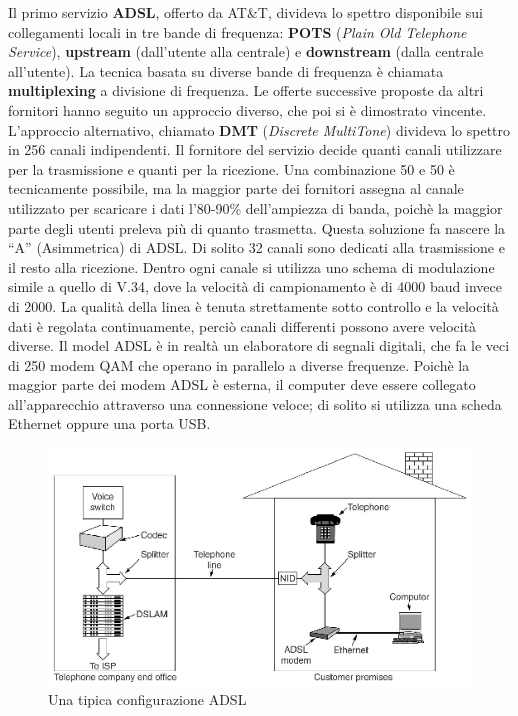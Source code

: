 Il primo servizio \textbf{ADSL}, offerto da AT\&T, divideva lo spettro disponibile sui collegamenti locali in tre bande di frequenza: \textbf{POTS} (\textit{Plain Old Telephone Service}), \textbf{upstream} (dall'utente alla centrale) e \textbf{downstream} (dalla centrale all'utente). La tecnica basata su diverse bande di frequenza è chiamata \textbf{multiplexing} a divisione di frequenza.
Le offerte successive proposte da altri fornitori hanno seguito un approccio diverso, che poi si è dimostrato vincente. L'approccio alternativo, chiamato \textbf{DMT} (\textit{Discrete MultiTone}) divideva lo spettro in 256 canali indipendenti. Il fornitore del servizio decide quanti canali utilizzare per la trasmissione e quanti per la ricezione. Una combinazione 50 e 50 è tecnicamente possibile, ma la maggior parte dei fornitori assegna al canale utilizzato per scaricare i dati l'80-90\% dell'ampiezza di banda, poichè la maggior parte degli utenti preleva più di quanto trasmetta. Questa soluzione fa nascere la ``A'' (Asimmetrica) di ADSL. Di solito 32 canali sono dedicati alla trasmissione e il resto alla ricezione.
Dentro ogni canale si utilizza uno schema di modulazione simile a quello di V.34, dove la velocità di campionamento è di 4000 baud invece di 2000. La qualità della linea è tenuta strettamente sotto controllo e la velocità dati è regolata continuamente, perciò canali differenti possono avere velocità diverse.
Il model ADSL è in realtà un elaboratore di segnali digitali, che fa le veci di 250 modem QAM che operano in parallelo a diverse frequenze. Poichè la maggior parte dei modem ADSL è esterna, il computer deve essere collegato all'apparecchio attraverso una connessione veloce; di solito si utilizza una scheda Ethernet oppure una porta USB.

\begin{figure}[htbp]
\centering
\includegraphics[width=120mm]{images/adsl_configuration.png}
\caption{Una tipica configurazione ADSL}
\end{figure}



